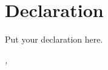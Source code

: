 

\chapter*{Declaration} %

\thispagestyle{empty}

Put your declaration here.
\bigskip
 
\noindent\textit{\myLocation, \myTime}

\smallskip


